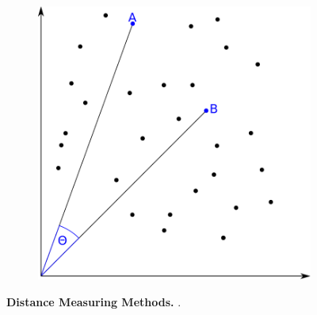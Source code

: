 \begin{figure}
\begin{adjustbox}{minipage=\dimexpr{}\fboxrule,fbox}
\begin{subfigure}[b]{0.475\textwidth}
            \label{subfig:Cosinus}            \includegraphics[width=\textwidth]{Graphics/Cosinus.pdf}
        \end{subfigure}
    \end{adjustbox}
    \caption[Distance Measuring Methods]{\textbf{Distance Measuring Methods.} .}
    \label{fig:Distance}
\end{figure}

